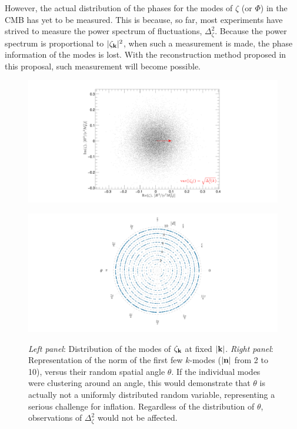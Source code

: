 \documentclass[psfig,11pt]{article}
\def\be{\begin{equation}}
\def\ee{\end{equation}}
\begin{document}
However, the actual distribution of the phases for the modes of $\zeta$ (or $\Phi$) in the CMB has yet to be measured. This is because, so far, most experiments have strived to measure the power spectrum of fluctuations, $\Delta_\zeta^2$. %
Because the power spectrum is proportional to $ |\zeta_{{\bf k}}|^2$, when such a measurement is made, the phase information of the modes is lost. With the reconstruction method proposed in this proposal, such measurement will become possible.

\begin{figure}[t]
\vspace{-2cm}
\begin{center}
\centering
\begin{minipage}[t]{0.48\linewidth}
\centering
\includegraphics[trim = 80 -32 0 50 mm, width=.8\textwidth]{onemodeThetadist.pdf}\\
\end{minipage}
\begin{minipage}[t]{0.48\linewidth}
\centering
\includegraphics[trim = 0 0 0 0 mm, clip, width=.8\textwidth]{first10modesThetadist.pdf}\\
\end{minipage}
\caption{\label{f:variations}
{\it Left panel}: \small{Distribution of the modes of $\zeta_{{\bf k}}$ at fixed $|{\bf k}|$.} {\it Right panel}: \small{Representation of  the norm of the first few $k$-modes ($|{\bf n}|$ from 2 to 10),
versus their random spatial angle $\theta$. If the individual modes were clustering around an angle, this would demonstrate that $\theta$ is actually not a uniformly distributed random variable, representing a serious challenge for inflation. Regardless of the distribution of $\theta$, observations of $\Delta_\zeta^2$ would not be affected. }
\vspace{-1cm}
}

\end{center}
\end{figure}
\end{document}
